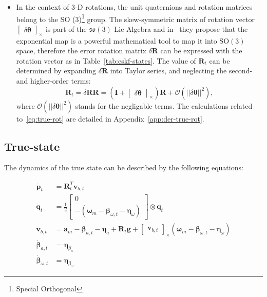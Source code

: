 \begin{itemize}
    \item 
    In the context of 3-D rotations, the unit quaternions and rotation matrices belong to the SO (3)\footnote{Special Orthogonal} group. The skew-symmetric matrix of rotation vector $\begin{bmatrix} \delta\boldsymbol{\theta} \end{bmatrix}_\times$ is part of the $\mathfrak{so}(3)$ Lie Algebra and in~\cite{quaternion-eskf} they propose that the exponential map is a powerful mathematical tool to map it into $\mathrm{SO}(3)$ space, therefore the error rotation matrix $\delta\mathbf{R}$ can be expressed with the rotation vector as in Table~\ref{tab:eskf-states}. The value of $\mathbf{R}_t$ can be determined by expanding $\delta\mathbf{R}$ into Taylor series, and neglecting the second- and higher-order terms:
    \begin{equation}
         \mathbf{R}_t=\delta\mathbf{R}\mathbf{R}=\left(\mathbf{I} +\begin{bmatrix} \delta\boldsymbol{\theta} \end{bmatrix}_\times\right) \mathbf{R} + \mathcal{O}(||\delta\boldsymbol{\theta}||^2),
    \label{eq:true-rot}
    \end{equation}    
    where $\mathcal{O}(||\delta\boldsymbol{\theta}||^2)$ stands for the negligable terms. The calculations related to~\eqref{eq:true-rot} are detailed in Appendix~\ref{app:der-true-rot}.
\end{itemize} 


\subsection*{True-state}

The dynamics of the true state can be described by the following equations:

\begin{subequations}
    \begin{align}
        \dot{\mathbf{p}}_{t}&=\mathbf{R}_t^T \mathbf{v}_{b,t} \\
        \dot{\mathbf{q}}_{t}&=\frac{1}{2}\begin{bmatrix}0\\ -(\boldsymbol{\omega}_m-\boldsymbol{\beta}_{\omega, t}-\boldsymbol{\eta}_{\omega}) \end{bmatrix}\otimes \mathbf{q}_{t} \label{subeq:true-q} \\
        \dot{\mathbf{v}}_{b,t}&=\mathbf{a}_m-\boldsymbol{\beta}_{a,t}-\boldsymbol{\eta}_a +\mathbf{R}_t\mathbf{g} + \begin{bmatrix}\mathbf{v}_{b,t} \end{bmatrix}_{\times}(\boldsymbol{\omega}_m-\boldsymbol{\beta}_{\omega,t} -\boldsymbol{\eta}_\omega) \label{subeq:true-vb}\\
        \dot{\boldsymbol{\beta}}_{a,t}&=\boldsymbol{\eta}_{\beta_a} \label{subeq:true-ba}\\
        \dot{\boldsymbol{\beta}}_{\omega,t}&=\boldsymbol{\eta}_{\beta_\omega} \label{subeq:true-bw}
    \end{align}\label{eq:true-state}
\end{subequations}

